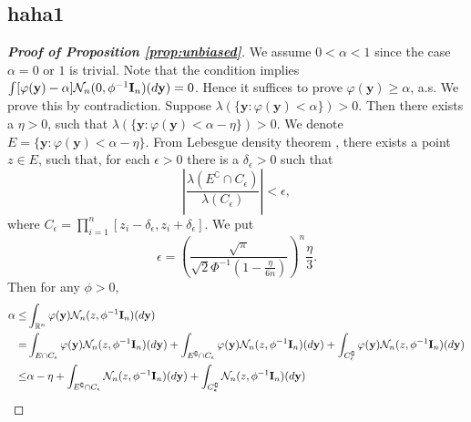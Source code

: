 \documentclass[11pt]{article}
\newcommand{\By}{\mathbf{y}}    \newcommand{\Bz}{\mathbf{z}}
\theoremstyle{plain}
\theoremstyle{definition}
\theoremstyle{remark}
\begin{document}
\begin{appendices}

    \section{haha1}

\begin{proof}[\textbf{Proof of Proposition \ref{prop:unbiased}}]
    We assume $0<\alpha<1$ since the case $\alpha=0$ or $1$ is trivial.
    Note that the condition implies $\int [\varphi(\By)-\alpha] \mathcal N_n (0,\phi^{-1} \BI_n) (d\By)=0$.
    Hence it suffices to prove $\varphi(\By) \geq \alpha$, a.s. 
    We prove this by contradiction.
    Suppose $\lambda(\{\By:\varphi (\By) <\alpha\})>0$.
    Then there exists a $\eta >0$, such that $\lambda(\{\By:\varphi (\By) <\alpha-\eta\})>0$.
    We denote $E=\{\By:\varphi (\By) <\alpha-\eta\}$.
    From Lebesgue density theorem \citep[Corollary 6.2.6]{book:992991}, there exists a point $z\in E$, such that, for each $\epsilon >0$ there is a $\delta_{\epsilon}>0$ such that
    \begin{equation*}
        \left|\frac{\lambda(E^\complement\cap C_{\epsilon})}{\lambda(C_{\epsilon})}\right|<\epsilon,
    \end{equation*}
    where $C_{\epsilon}=\prod_{i=1}^n [z_i-\delta_{\epsilon}, z_i + \delta_{\epsilon}]$.
    We put
    \begin{equation*}
        \epsilon=\left(\frac{\sqrt \pi}{\sqrt 2 \Phi^{-1}\left(1-\frac{\eta}{6n}\right)}\right)^n \frac{\eta}{3}.
    \end{equation*}
    Then for any $\phi>0$,
    \begin{equation*}
        \begin{split}
            \alpha \leq& 
            \int_{\mathbb R^n}\varphi(\By) \mathcal N_n (z, \phi^{-1} \BI_n) (d\By)
            \\
            =&
            \int_{E\cap C_{\epsilon}}\varphi(\By) \mathcal N_n (z, \phi^{-1} \BI_n) (d\By)
            +
            \int_{E^\complement\cap C_{\epsilon}}\varphi(\By) \mathcal N_n (z, \phi^{-1} \BI_n) (d\By)
            +
            \int_{C_{\epsilon}^\complement}\varphi(\By) \mathcal N_n (z, \phi^{-1} \BI_n) (d\By)
            \\
            \leq&
            \alpha-\eta
            +
            \int_{E^\complement\cap C_{\epsilon}} \mathcal N_n (z, \phi^{-1} \BI_n) (d\By)
            +
            \int_{C_{\epsilon}^\complement} \mathcal N_n (z, \phi^{-1} \BI_n) (d\By)

\end{split}
\end{equation*}
\end{proof}
\end{appendices}
\end{document}
